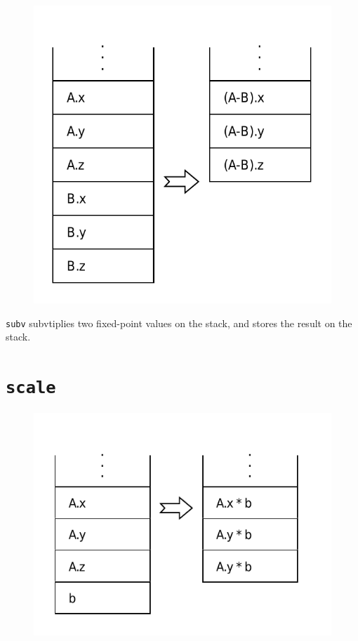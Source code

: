	\begin{figure}
		\begin{flushright}
			\includegraphics[width=0.9\linewidth]{figure/pdf/i_subv} 
		\end{flushright}
	\end{figure}

		\texttt{subv} subvtiplies two fixed-point values on the stack, and stores
		the result on the stack.

\section*{\texttt{scale}}

	\begin{figure}
		\begin{flushright}
			\includegraphics[width=0.9\linewidth]{figure/pdf/i_scale} 
		\end{flushright}
	\end{figure}

